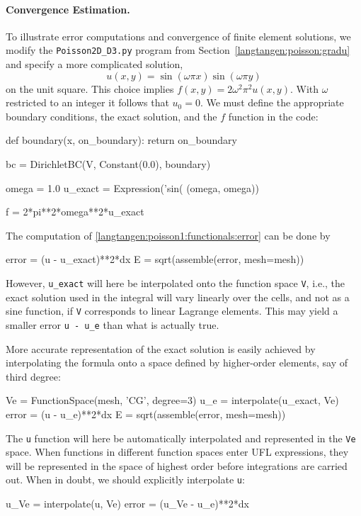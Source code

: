 \paragraph{Convergence Estimation.}
To illustrate error computations and convergence of finite element
solutions, we modify the {\fontsize{10pt}{10pt}\verb!Poisson2D_D3.py!} program from
Section~\ref{langtangen:poisson:gradu} and specify a more complicated solution,
\[ u(x,y) = \sin(\omega\pi x)\sin(\omega\pi y)\]
on the unit square. 
This choice implies $f(x,y)=2\omega^2\pi^2 u(x,y)$.
With $\omega$ restricted to an integer
it follows that $u_0=0$. We must define the
appropriate boundary conditions, the exact solution, and the $f$ function
in the code:
\begin{python}
def boundary(x, on_boundary):
    return on_boundary

bc = DirichletBC(V, Constant(0.0), boundary)

omega = 1.0
u_exact = Expression('sin(%
                     (omega, omega))

f = 2*pi**2*omega**2*u_exact
\end{python}

The computation of \eqref{langtangen:poisson1:functionals:error} can be done by
\begin{python}
error = (u - u_exact)**2*dx
E = sqrt(assemble(error, mesh=mesh))
\end{python}
However, {\fontsize{10pt}{10pt}\verb!u_exact!} will here be interpolated onto
the function space {\fontsize{10pt}{10pt}\texttt{V}}, i.e., the exact solution used in
the integral will vary linearly over
the cells, and not as a sine function, 
if {\fontsize{10pt}{10pt}\texttt{V}} corresponds to linear Lagrange elements.
This may yield a smaller error {\fontsize{10pt}{10pt}\verb!u - u_e!} than what is actually true.

More accurate representation of the exact solution is easily achieved
by interpolating the formula onto a space defined by
higher-order elements, say of third degree:
\begin{python}
Ve = FunctionSpace(mesh, 'CG', degree=3)
u_e = interpolate(u_exact, Ve)
error = (u - u_e)**2*dx
E = sqrt(assemble(error, mesh=mesh))
\end{python}
The {\fontsize{10pt}{10pt}\texttt{u}} function will here be automatically interpolated and
represented in the
{\fontsize{10pt}{10pt}\texttt{Ve}} space. When functions in different function spaces enter
UFL expressions, they will be represented in the space of highest
order before integrations are carried out. When in doubt, we should
explicitly interpolate {\fontsize{10pt}{10pt}\texttt{u}}:
\begin{python}
u_Ve = interpolate(u, Ve)
error = (u_Ve - u_e)**2*dx
\end{python}

